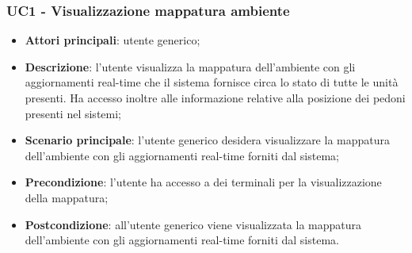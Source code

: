 \subsubsection{UC1 - Visualizzazione mappatura ambiente}
\begin{itemize}
		\item \textbf{Attori principali}: utente generico;
		\item \textbf{Descrizione}: l'utente visualizza la mappatura dell'ambiente con gli aggiornamenti real-time che il sistema fornisce circa lo stato di tutte le unità presenti. Ha accesso inoltre alle informazione relative alla posizione dei pedoni presenti nel sistemi;
		\item \textbf{Scenario principale}: l'utente generico desidera visualizzare la mappatura dell'ambiente con gli aggiornamenti real-time forniti dal sistema; 
		\item \textbf{Precondizione}: l'utente ha accesso a dei terminali per la visualizzazione della mappatura;
		\item \textbf{Postcondizione}: all'utente generico viene visualizzata la mappatura dell'ambiente con gli aggiornamenti real-time forniti dal sistema. 
\end{itemize}